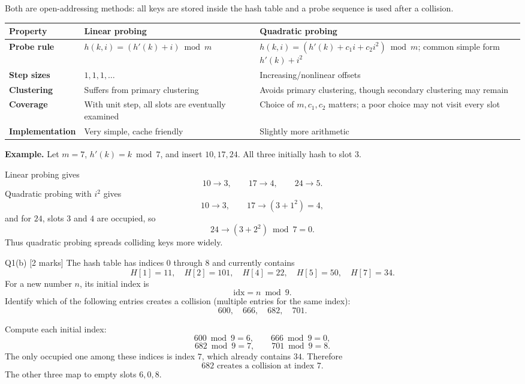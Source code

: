 \documentclass[10.5pt,a4paper]{article}
\begin{document}
\begin{answerbox}
Both are open-addressing methods: all keys are stored inside the hash table and a probe sequence is used after a collision.

\begin{center}
\small
\begin{tabularx}{0.96\textwidth}{>{\bfseries}p{3cm}XX}
\toprule
Property & Linear probing & Quadratic probing\\
\midrule
Probe rule & $h(k,i)=(h'(k)+i)\bmod m$ & $h(k,i)=(h'(k)+c_1i+c_2i^2)\bmod m$; common simple form $h'(k)+i^2$\\
Step sizes & $1,1,1,\ldots$ & Increasing/nonlinear offsets\\
Clustering & Suffers from primary clustering & Avoids primary clustering, though secondary clustering may remain\\
Coverage & With unit step, all slots are eventually examined & Choice of $m,c_1,c_2$ matters; a poor choice may not visit every slot\\
Implementation & Very simple, cache friendly & Slightly more arithmetic\\
\bottomrule
\end{tabularx}
\end{center}

\textbf{Example.} Let $m=7$, $h'(k)=k\bmod7$, and insert $10,17,24$. All three initially hash to slot $3$.

Linear probing gives
\[
10\to3,\qquad17\to4,\qquad24\to5.
\]
Quadratic probing with $i^2$ gives
\[
10\to3,\qquad17\to(3+1^2)=4,
\]
and for $24$, slots $3$ and $4$ are occupied, so
\[
24\to(3+2^2)\bmod7=0.
\]
Thus quadratic probing spreads colliding keys more widely.
\end{answerbox}

\begin{questionbox}{Q1(b) [2 marks]}
The hash table has indices $0$ through $8$ and currently contains
\[
H[1]=11,\quad H[2]=101,\quad H[4]=22,\quad H[5]=50,\quad H[7]=34.
\]
For a new number $n$, its initial index is
\[
\text{idx}=n\bmod9.
\]
Identify which of the following entries creates a collision (multiple entries for the same index):
\[
600,\quad666,\quad682,\quad701.
\]
\end{questionbox}

\begin{answerbox}
Compute each initial index:
\[
600\bmod9=6,
\qquad
666\bmod9=0,
\]
\[
682\bmod9=7,
\qquad
701\bmod9=8.
\]
The only occupied one among these indices is index $7$, which already contains $34$. Therefore
\[
\boxed{682\text{ creates a collision at index }7.}
\]
The other three map to empty slots $6,0,8$.
\end{answerbox}
\end{document}
